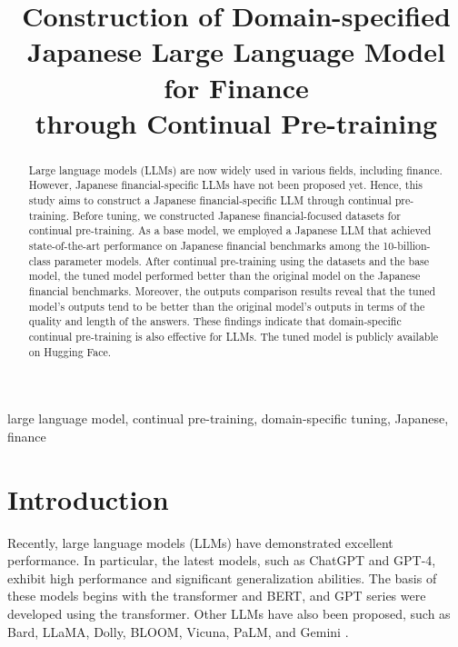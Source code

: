 
\title{Construction of Domain-specified\\Japanese Large Language Model for Finance\\through Continual Pre-training}
\maketitle

\begin{abstract}
    Large language models (LLMs) are now widely used in various fields, including finance.
    However, Japanese financial-specific LLMs have not been proposed yet.
    Hence, this study aims to construct a Japanese financial-specific LLM through continual pre-training.
    Before tuning, we constructed Japanese financial-focused datasets for continual pre-training.
    As a base model, we employed a Japanese LLM that achieved state-of-the-art performance on Japanese financial benchmarks among the 10-billion-class parameter models.
    After continual pre-training using the datasets and the base model, the tuned model performed better than the original model on the Japanese financial benchmarks.
    Moreover, the outputs comparison results reveal that the tuned model's outputs tend to be better than the original model's outputs in terms of the quality and length of the answers.
    These findings indicate that domain-specific continual pre-training is also effective for LLMs.
    The tuned model is publicly available on Hugging Face.
\end{abstract}

\begin{IEEEkeywords}
    large language model, continual pre-training, domain-specific tuning, Japanese, finance
\end{IEEEkeywords}

\section{Introduction}
Recently, large language models (LLMs) have demonstrated excellent performance.
In particular, the latest models, such as ChatGPT\cite{chatgpt} and GPT-4\cite{GPT4}, exhibit high performance and significant generalization abilities.
The basis of these models begins with the transformer \cite{Vaswani2017} and BERT\cite{Devlin2018}, and GPT series \cite{GPT-1,GPT-2,GPT-3} were developed using the transformer.
Other LLMs have also been proposed, such as Bard\cite{bard}, LLaMA\cite{touvron2023llama,Touvron2023}, Dolly\cite{dolly}, BLOOM\cite{scao2022bloom}, Vicuna\cite{vicuna}, PaLM\cite{Chowdhery2022,Anil2023}, and Gemini \cite{gemini}.

